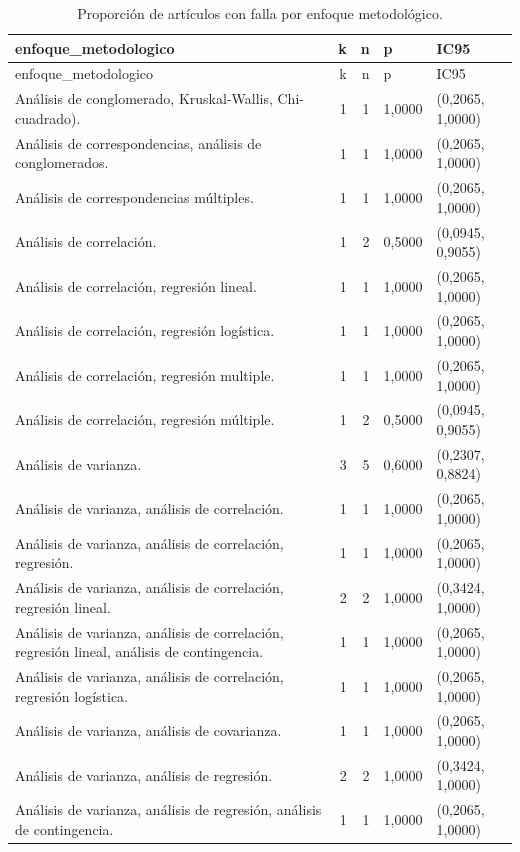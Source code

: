 \begingroup\small
\begin{longtable}{P{0,56\linewidth}rrP{0,10\linewidth}P{0,24\linewidth}}
\caption{Proporción de artículos con falla por enfoque metodológico.}\label{tab:enfoque_metodologico}\\
\toprule
enfoque\_metodologico & k & n & p & IC95\\
\midrule
\endfirsthead
\toprule
enfoque\_metodologico & k & n & p & IC95\\
\midrule
\endhead
Análisis de conglomerado, Kruskal-Wallis, Chi-cuadrado). & 1 & 1 & 1,0000 & (0,2065, 1,0000)\\
Análisis de correspondencias, análisis de conglomerados. & 1 & 1 & 1,0000 & (0,2065, 1,0000)\\
Análisis de correspondencias múltiples. & 1 & 1 & 1,0000 & (0,2065, 1,0000)\\
Análisis de correlación. & 1 & 2 & 0,5000 & (0,0945, 0,9055)\\
Análisis de correlación, regresión lineal. & 1 & 1 & 1,0000 & (0,2065, 1,0000)\\
Análisis de correlación, regresión logística. & 1 & 1 & 1,0000 & (0,2065, 1,0000)\\
Análisis de correlación, regresión multiple. & 1 & 1 & 1,0000 & (0,2065, 1,0000)\\
Análisis de correlación, regresión múltiple. & 1 & 2 & 0,5000 & (0,0945, 0,9055)\\
Análisis de varianza. & 3 & 5 & 0,6000 & (0,2307, 0,8824)\\
Análisis de varianza, análisis de correlación. & 1 & 1 & 1,0000 & (0,2065, 1,0000)\\
Análisis de varianza, análisis de correlación, regresión. & 1 & 1 & 1,0000 & (0,2065, 1,0000)\\
Análisis de varianza, análisis de correlación, regresión lineal. & 2 & 2 & 1,0000 & (0,3424, 1,0000)\\
Análisis de varianza, análisis de correlación, regresión lineal, análisis de contingencia. & 1 & 1 & 1,0000 & (0,2065, 1,0000)\\
Análisis de varianza, análisis de correlación, regresión logística. & 1 & 1 & 1,0000 & (0,2065, 1,0000)\\
Análisis de varianza, análisis de covarianza. & 1 & 1 & 1,0000 & (0,2065, 1,0000)\\
Análisis de varianza, análisis de regresión. & 2 & 2 & 1,0000 & (0,3424, 1,0000)\\
Análisis de varianza, análisis de regresión, análisis de contingencia. & 1 & 1 & 1,0000 & (0,2065, 1,0000)\\

\end{longtable}
